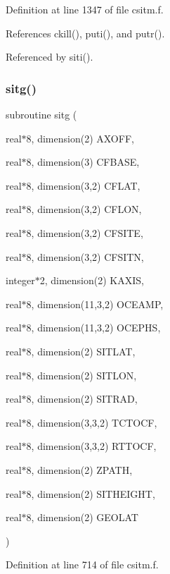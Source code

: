 Definition at line 1347 of file csitm.\+f.



References ckill(), puti(), and putr().



Referenced by siti().

\mbox{\label{csitm_8f_ae33d05b01559c9c88ffe00c97a87d9e0}} 
\subsubsection{\texorpdfstring{sitg()}{sitg()}}
{\footnotesize\ttfamily subroutine sitg (\begin{DoxyParamCaption}\item[{real$\ast$8, dimension(2)}]{A\+X\+O\+FF,  }\item[{real$\ast$8, dimension(3)}]{C\+F\+B\+A\+SE,  }\item[{real$\ast$8, dimension(3,2)}]{C\+F\+L\+AT,  }\item[{real$\ast$8, dimension(3,2)}]{C\+F\+L\+ON,  }\item[{real$\ast$8, dimension(3,2)}]{C\+F\+S\+I\+TE,  }\item[{real$\ast$8, dimension(3,2)}]{C\+F\+S\+I\+TN,  }\item[{integer$\ast$2, dimension(2)}]{K\+A\+X\+IS,  }\item[{real$\ast$8, dimension(11,3,2)}]{O\+C\+E\+A\+MP,  }\item[{real$\ast$8, dimension(11,3,2)}]{O\+C\+E\+P\+HS,  }\item[{real$\ast$8, dimension(2)}]{S\+I\+T\+L\+AT,  }\item[{real$\ast$8, dimension(2)}]{S\+I\+T\+L\+ON,  }\item[{real$\ast$8, dimension(2)}]{S\+I\+T\+R\+AD,  }\item[{real$\ast$8, dimension(3,3,2)}]{T\+C\+T\+O\+CF,  }\item[{real$\ast$8, dimension(3,3,2)}]{R\+T\+T\+O\+CF,  }\item[{real$\ast$8, dimension(2)}]{Z\+P\+A\+TH,  }\item[{real$\ast$8, dimension(2)}]{S\+I\+T\+H\+E\+I\+G\+HT,  }\item[{real$\ast$8, dimension(2)}]{G\+E\+O\+L\+AT }\end{DoxyParamCaption})}



Definition at line 714 of file csitm.\+f.



